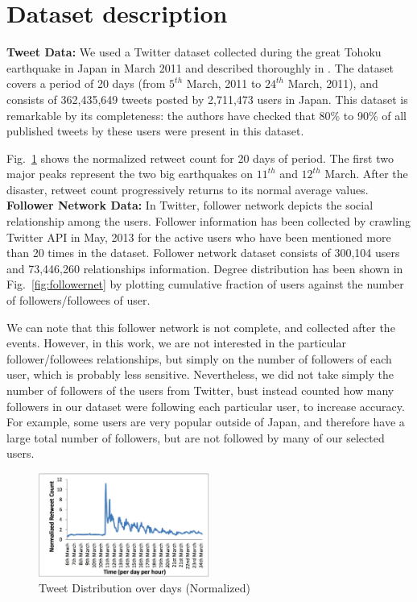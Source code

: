 \documentclass[conference]{IEEEtran}
\begin{document}


\section{Dataset description}
\textbf{Tweet Data:} We used a Twitter dataset collected during the great Tohoku earthquake in Japan in March 2011 and described thoroughly in \cite{toriumi2013information}. The dataset covers a period of 20 days (from $5^{th}$ March, 2011 to $24^{th}$ March, 2011), and consists of 362,435,649 tweets posted by 2,711,473 users in Japan. This dataset is remarkable by its completeness: the authors have checked that 80\% to 90\% of all published tweets by these users were present in this dataset.

Fig.~\ref{fig:retweetdist} shows the normalized retweet count for 20 days of period. The first two major peaks represent the two big earthquakes on $11^{th}$ and $12^{th}$ March. After the disaster, retweet count progressively returns to its normal average values. \\



\noindent\textbf{Follower Network Data:} In Twitter, follower network depicts the social relationship among the users. Follower information has been collected by crawling Twitter API in May, 2013 for the active users who have been mentioned more than 20 times in the dataset.
Follower network dataset consists of 300,104 users and 73,446,260 relationships information. Degree distribution has been shown in Fig.~\ref{fig:followernet} by plotting cumulative fraction of users against the number of followers/followees of user.

We can note that this follower network is not complete, and collected after the events. However, in this work, we are not interested in the particular follower/followees relationships, but simply on the number of followers of each user, which is probably less sensitive. Nevertheless, we did not take simply the number of followers of the users from Twitter, bust instead counted how many followers in our dataset were following each particular user, to increase accuracy. For example, some users are very popular outside of Japan, and therefore have a large total number of followers, but are not followed by many of our selected users.

\begin{figure}[h]
    \includegraphics[width=0.5\textwidth]{data/retweetCount.jpg}
    \caption{Tweet Distribution over days (Normalized)}
    \label{fig:retweetdist}
\end{figure}
\end{document}
